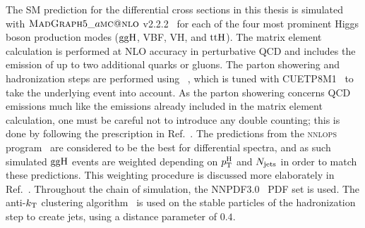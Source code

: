 The SM prediction for the differential cross sections in this thesis is simulated with $\textsc{MadGraph}{}5\_a\textsc{mc@nlo}$ v2.2.2~\cite{Alwall:2014hca} for each of the four most prominent Higgs boson production modes ($\mathrm{g}\mathrm{g}\mathrm{H}$, VBF, VH, and $\mathrm{t}\mathrm{t}\mathrm{H}$).
% 
The matrix element calculation is performed at NLO accuracy in perturbative QCD and includes the emission of up to two additional quarks or gluons.
% 
The parton showering and hadronization steps are performed using ~\cite{Sjostrand:2014zea}, which is tuned with CUETP8M1~\cite{Skands:1695787} to take the underlying event into account.
% 
As the parton showering concerns QCD emissions much like the emissions already included in the matrix element calculation, one must be careful not to introduce any double counting; this is done by following the prescription in Ref.~\cite{Frederix:2012ps}.
% 
The predictions from the {\textsc{nnlops}} program~\cite{Hamilton:2012np, Kardos:2014dua} are considered to be the best for differential spectra, and as such simulated $\mathrm{g}\mathrm{g}\mathrm{H}$ events are weighted depending on $p_\mathrm{T}^\mathrm{H}$ and $N_\text{jets} $ in order to match these predictions.
% 
This weighting procedure is discussed more elaborately in Ref.~\cite{Sirunyan:2018koj}.
% 
Throughout the chain of simulation, the NNPDF3.0~\cite{Ball:2014uwa} PDF set is used.
% 
The anti-$k_\mathrm{T}$ clustering algorithm~\cite{Cacciari:2008gp} is used on the stable particles of the hadronization step to create jets, using a distance parameter of $0.4$.



